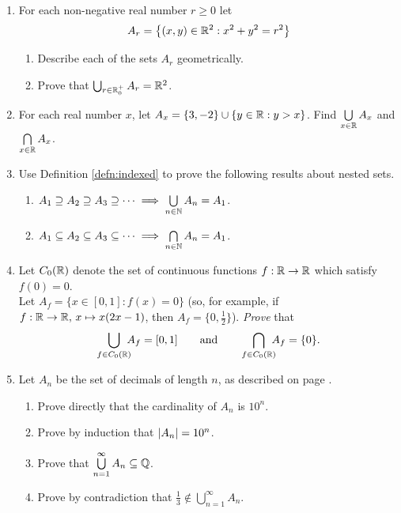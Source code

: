 \begin{exercises}{}{}
\begin{enumerate}
  \item For each non-negative real number $r\ge 0$ let 
  \[A_r=\big\{(x,y)\in\mathbb{R}^2:x^2+y^2=r^2\big\}\]
		\begin{enumerate}
  		\item Describe each of the sets $A_r$ geometrically.
  		\item Prove that $\bigcup_{r\in\mathbb{R}^+_0}A_r=\mathbb{R}^2$.
		\end{enumerate}

  \item For each real number $x$, let $A_x=\{3,-2\}\cup\{y\in\mathbb{R}:y>x\}$. Find $\bigcup\limits_{x\in\mathbb{R}}A_x$ and $\bigcap\limits_{x\in\mathbb{R}}A_x$.
  
  \item Use Definition \ref{defn:indexed} to prove the following results about nested sets.
		\begin{enumerate}
  		\item $A_1\supseteq A_2\supseteq A_3\supseteq\cdots\implies \bigcup\limits_{n\in\mathbb{N}}A_n=A_1$.
  		\item $A_1\subseteq A_2\subseteq A_3\subseteq\cdots\implies \bigcap\limits_{n\in\mathbb{N}}A_n=A_1$.
		\end{enumerate}

  \item Let $C_0(\mathbb{R})$ denote the set of continuous functions $f:\mathbb{R}\to\mathbb{R}$ which satisfy $f(0)=0$.\\
  Let $A_f=\{x\in[0,1]:f(x)=0\}$ (so, for example, if $f:\mathbb{R}\to\mathbb{R},\,x \mapsto x(2x-1)$, then $A_f=\{0,\frac 12\}$).
    \emph{Prove} that
  \[\bigcup\limits_{f\in C_0(\mathbb{R})}\negthickspace\negthickspace A_f=[0,1]\qquad\text{and}\qquad\bigcap\limits_{f\in C_0(\mathbb{R})}\negthickspace\negthickspace A_f=\{0\}.\]
		
	\item Let $A_n$ be the set of decimals of length $n$, as described on page \pageref{ex:finitedec}.
		\begin{enumerate}
	  	\item Prove directly that the cardinality of $A_n$ is $10^n$.
	  	\item Prove by induction that $\left| A_n\right|=10^n$.
	  	\item Prove that $\bigcup\limits_{n=1}^\infty A_n\subseteq\mathbb{Q}$.
			\item Prove by contradiction that $\frac 13\not\in\bigcup\limits_{n=1}^\infty A_n$.
		\end{enumerate}


\end{enumerate}
\end{exercises}
